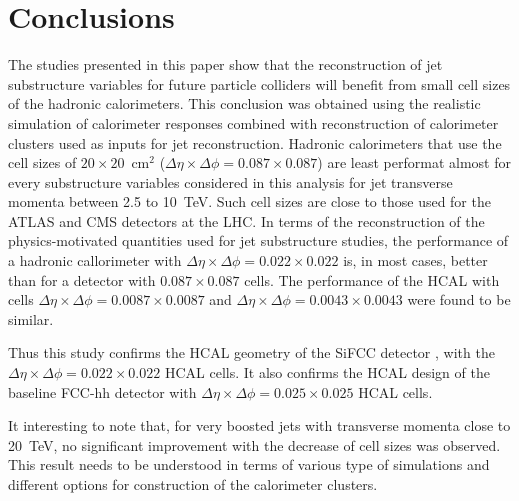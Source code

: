 \section{Conclusions}
The studies presented in this paper show that the reconstruction of jet substructure 
variables for future particle colliders will benefit from small cell sizes of the hadronic calorimeters. 
This conclusion was obtained using the realistic \GEANTfour simulation of calorimeter responses combined with reconstruction of 
calorimeter clusters used as inputs for jet reconstruction. 
Hadronic calorimeters that use the cell sizes of $20\times 20$~cm$^2$ ($\Delta \eta \times \Delta \phi = 0.087\times 0.087$) 
are least performat almost for every 
substructure variables considered in this analysis for jet transverse momenta between 2.5 to 10~TeV. 
Such cell sizes are close to 
those used for the ATLAS and CMS detectors at the LHC. 
In terms of the reconstruction of the physics-motivated quantities  
used for jet substructure studies, the  performance 
of a  hadronic callorimeter  with 
$\Delta \eta \times \Delta \phi = 0.022\times0.022$ is, in most cases,
better than for a detector with  $0.087\times 0.087$ cells.
The performance of the HCAL with cells $\Delta \eta \times \Delta \phi = 0.0087\times 0.0087$ and
$\Delta \eta \times \Delta \phi = 0.0043\times 0.0043$ were found to be similar.

Thus this study confirms the  HCAL geometry of the SiFCC detector \cite{Chekanov:2016ppq},
with the $\Delta \eta \times \Delta \phi = 0.022\times0.022$ HCAL cells.
It also confirms the HCAL design of the baseline FCC-hh \cite{fcc1,fcc2} detector with
$\Delta \eta \times \Delta \phi = 0.025\times0.025$ HCAL cells.

It interesting to note that,  for very boosted jets with transverse momenta close to 20~TeV, no significant improvement with the 
decrease of cell sizes was observed. This result needs to be understood in terms of various type of simulations and 
different options for construction of the calorimeter clusters.


